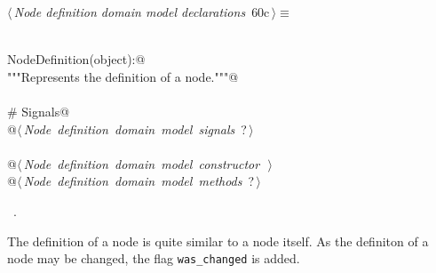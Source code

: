 \documentclass[
    a4paper,      %
    10pt,         %
    openright,    %
    notitlepage,  %
    parskip=half, %
]{scrreprt}       %
\theoremstyle{definition}                    %
\begin{document}
\begin{flushleft} \small
\begin{minipage}{\linewidth}\label{scrap102}\raggedright\small
{} $\langle\,${\itshape Node definition domain model declarations}\nobreak\ {\footnotesize {60c}}$\,\rangle\equiv$
\vspace{-1ex}
\begin{list}{}{} \item
\mbox{}\lstinline@@\\
\mbox{}\lstinline@class NodeDefinition(object):@\\
\mbox{}\lstinline@    """Represents the definition of a node."""@\\
\mbox{}\lstinline@@\\
\mbox{}\lstinline@    # Signals@\\
\mbox{}\lstinline@    @\hbox{$\langle\,${\itshape Node definition domain model signals}\nobreak\ {\footnotesize ?}$\,\rangle$}\lstinline@@\\
\mbox{}\lstinline@@\\
\mbox{}\lstinline@    @\hbox{$\langle\,${\itshape Node definition domain model constructor}\nobreak\ {\footnotesize {}}$\,\rangle$}\lstinline@@\\
\mbox{}\lstinline@    @\hbox{$\langle\,${\itshape Node definition domain model methods}\nobreak\ {\footnotesize ?}$\,\rangle$}\lstinline@@{\NWsep}
\end{list}
\vspace{-1.5ex}
\footnotesize
\begin{list}{}{\setlength{\itemsep}{-\parsep}\setlength{\itemindent}{-\leftmargin}}
\item \NWtxtMacroRefIn\ .

\item{}
\end{list}
\end{minipage}\vspace{4ex}
\end{flushleft}
The definition of a node is quite similar to a node itself. As the definiton of
a node may be changed, the flag \verb+was_changed+ is added.
\end{document}
